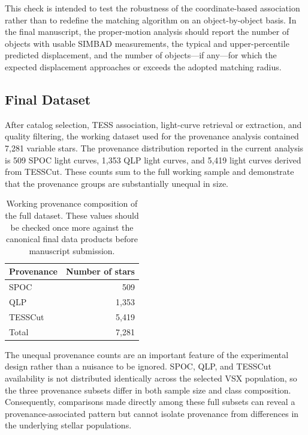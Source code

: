\documentclass[linenumbers]{aastex701}
\begin{document}
This check is intended to test the robustness of the coordinate-based association rather than to redefine the matching algorithm on an object-by-object basis. In the final manuscript, the proper-motion analysis should report the number of objects with usable SIMBAD measurements, the typical and upper-percentile predicted displacement, and the number of objects---if any---for which the expected displacement approaches or exceeds the adopted matching radius.


\subsection{Final Dataset}
\label{subsec:final_dataset}

After catalog selection, TESS association, light-curve retrieval or extraction, and quality filtering, the working dataset used for the provenance analysis contained 7,281 variable stars. The provenance distribution reported in the current analysis is 509 SPOC light curves, 1,353 QLP light curves, and 5,419 light curves derived from TESSCut. These counts sum to the full working sample and demonstrate that the provenance groups are substantially unequal in size.

\begin{table}[ht]
\centering
\caption{Working provenance composition of the full dataset. These values should be checked once more against the canonical final data products before manuscript submission.}
\label{tab:provenance_counts}
\begin{tabular}{lr}
\hline\hline
Provenance & Number of stars \\
\hline
SPOC & 509 \\
QLP & 1,353 \\
TESSCut & 5,419 \\
\hline
Total & 7,281 \\
\hline
\end{tabular}
\end{table}

The unequal provenance counts are an important feature of the experimental design rather than a nuisance to be ignored. SPOC, QLP, and TESSCut availability is not distributed identically across the selected VSX population, so the three provenance subsets differ in both sample size and class composition. Consequently, comparisons made directly among these full subsets can reveal a provenance-associated pattern but cannot isolate provenance from differences in the underlying stellar populations.
\end{document}
